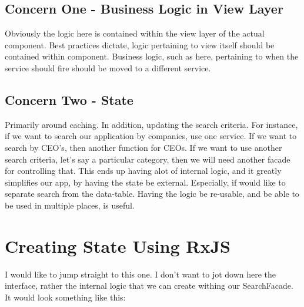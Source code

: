\subsection{Concern One - Business Logic in View Layer}
Obviously the logic here is contained within the view layer of the actual component. Best practices dictate, logic pertaining to view itself should be contained within component. Business logic, such as here, pertaining to when the service should fire should be moved to a different service. 

\subsection{Concern Two - State }
Primarily around caching. In addition, updating the search criteria. For instance, if we want to search our application by companies, use one service. If we want to search by CEO's, then another function for CEOs. If we want to use another search criteria, let's say a particular category, then we will need another facade for controlling that. This ends up having alot of internal logic, and it greatly simplifies our app, by having the state be external. Especially, if would like to separate search from the data-table. Having the logic be re-usable, and be able to be used in multiple places, is useful.

\section{Creating State Using RxJS}
I would like to jump straight to this one. I don't want to jot down here the interface, rather the internal logic that we can create withing our SearchFacade. It would look something like this:  

